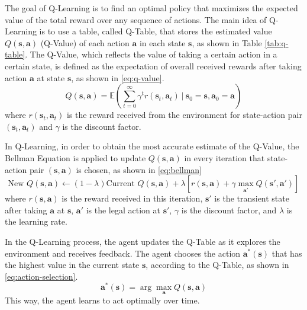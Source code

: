 \documentclass[10pt,a4paper]{article}
\begin{document}
	The goal of Q-Learning is to find an optimal policy that maximizes the expected value of the total reward over any sequence of actions. The main idea of Q-Learning is to use a table, called Q-Table, that stores the estimated value $Q(\boldsymbol{s}, \boldsymbol{a})$ (Q-Value) of each action $\boldsymbol{a}$ in each state $\boldsymbol{s}$, as shown in Table \ref{tab:q-table}. The Q-Value, which reflects the value of taking a certain action in a certain state, is defined as the expectation of overall received rewards after taking action $\boldsymbol{a}$ at state $\boldsymbol{s}$, as shown in \eqref{eq:q-value}. 
	\begin{equation}
		Q(\boldsymbol{s}, \boldsymbol{a}) = \mathbb{E}\left(\sum_{t = 0}^{\infty} \gamma^{t}r(\boldsymbol{s}_{t}, \boldsymbol{a}_{t}) ~\left|~ \boldsymbol{s}_{0} = \boldsymbol{s}, \boldsymbol{a}_{0} = \boldsymbol{a}\right.\right)
		\label{eq:q-value}
	\end{equation}
	where $r(\boldsymbol{s}_{t}, \boldsymbol{a}_{t})$ is the reward received from the environment for state-action pair $(\boldsymbol{s}_{t}, \boldsymbol{a}_{t})$ and $\gamma$ is the discount factor. 
	
	In Q-Learning, in order to obtain the most accurate estimate of the Q-Value,  the Bellman Equation is applied to update $Q(\boldsymbol{s}, \boldsymbol{a})$ in every iteration that state-action pair $(\boldsymbol{s}, \boldsymbol{a})$ is chosen, as shown in \eqref{eq:bellman}
	\begin{equation}
		\text{New~} Q(\boldsymbol{s}, \boldsymbol{a}) \leftarrow (1-\lambda)\text{Current~} Q(\boldsymbol{s}, \boldsymbol{a}) + \lambda \left[ r(\boldsymbol{s}, \boldsymbol{a}) + \gamma \max_{\boldsymbol{a'}}Q(\boldsymbol{s'}, \boldsymbol{a'})\right]
		\label{eq:bellman}
	\end{equation}
	where $r(\boldsymbol{s}, \boldsymbol{a})$ is the reward received in this iteration, $\boldsymbol{s'}$ is the transient state after taking $\boldsymbol{a}$ at $\boldsymbol{s}$, $\boldsymbol{a'}$ is the legal action at $\boldsymbol{s'}$, $\gamma$ is the discount factor, and $\lambda$ is the learning rate. 
	
	In the Q-Learning process, the agent updates the Q-Table as it explores the environment and receives feedback. The agent chooses the action $\boldsymbol{a}^{*}(\boldsymbol{s})$ that has the highest value in the current state $\boldsymbol{s}$, according to the Q-Table, as shown in \eqref{eq:action-selection}.  
	\begin{equation}
		\boldsymbol{a}^{*}(\boldsymbol{s}) = \arg\max_{\boldsymbol{a}}Q(\boldsymbol{s}, \boldsymbol{a})
		\label{eq:action-selection}
	\end{equation}
	This way, the agent learns to act optimally over time.
	
\end{document}
